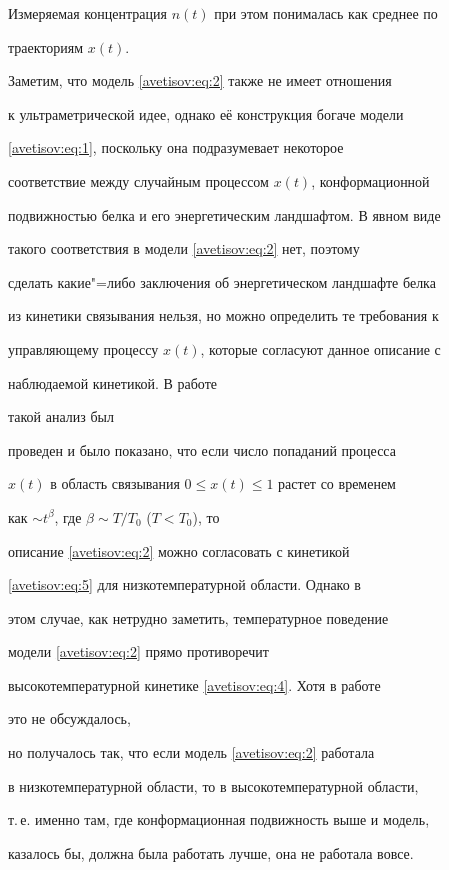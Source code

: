 Измеряемая концентрация $n(t)$ при этом понималась как среднее по

траекториям $x(t)$.



Заметим, что модель \eqref{avetisov:eq:2} также не имеет отношения

к ультраметрической идее, однако её конструкция богаче модели

\eqref{avetisov:eq:1}, поскольку она подразумевает некоторое

соответствие  между случайным процессом $x(t)$, конформационной

подвижностью белка и  его энергетическим ландшафтом. В явном виде

такого соответствия  в модели \eqref{avetisov:eq:2} нет, поэтому

сделать какие"=либо заключения об энергетическом ландшафте белка

из кинетики связывания нельзя, но можно определить те требования к

управляющему процессу $x(t)$, которые согласуют данное описание  с

наблюдаемой кинетикой.  В работе

\cite{avetisov_bikulov_zubarev:bib:Zharikov-2} такой анализ был

проведен и было показано, что  если число попаданий процесса

$x(t)$  в область связывания $0\leq x(t)\leq1$ растет  со временем

как $\sim t^{\beta}$, где $\beta \sim T/T_0$ ($T<T_0$), то

описание \eqref{avetisov:eq:2} можно согласовать с кинетикой

\eqref{avetisov:eq:5} для низкотемпературной области. Однако в

этом случае,  как нетрудно заметить, температурное поведение

модели \eqref{avetisov:eq:2} прямо противоречит

высокотемпературной кинетике \eqref{avetisov:eq:4}. Хотя в работе

\cite{avetisov_bikulov_zubarev:bib:Zharikov-2} это не обсуждалось,

но получалось так, что если модель \eqref{avetisov:eq:2} работала

в низкотемпературной области, то в высокотемпературной области,

т.\,е. именно там, где конформационная подвижность выше и модель,

казалось бы, должна была работать лучше, она не работала вовсе.



